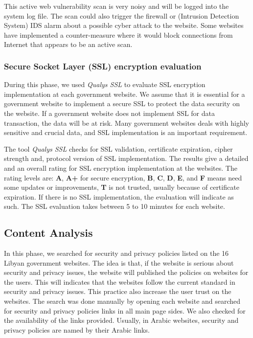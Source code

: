 \documentclass[conference]{IEEEtran}
\begin{document}
This active web vulnerability scan is very noisy and will be logged
into the system log file. The scan could also trigger the firewall or
(Intrusion Detection System) IDS alarm about a possible cyber attack
to the website. Some websites have implemented a counter-measure where
it would block connections from Internet that appears to be an active
scan\cite{stuttard2011web}.

\subsubsection{Secure Socket Layer (SSL) encryption evaluation}


During this phase, we used \emph{Qualys SSL} to evaluate SSL
encryption implementation at each government website. We assume that
it is essential for a government website to implement a secure SSL to
protect the data security on the website. If a government website does
not implement SSL for data transaction, the data will be at risk. Many
government websites deals with highly sensitive and crucial data, and
SSL implementation is an important requirement.

The tool \emph{Qualys SSL} checks for SSL validation, certificate
expiration, cipher strength and, protocol version of SSL
implementation. The results give a detailed and an overall rating for
SSL encryption implementation at the websites. The rating levels are:
\textbf{A}, \textbf{A+} for secure encryption, \textbf{B}, \textbf{C},
\textbf{D}, \textbf{E}, and \textbf{F} means need some updates or
improvements, \textbf{T} is not trusted, usually because of
certificate expiration. If there is no SSL implementation, the
evaluation will indicate as such.  The SSL evaluation takes between 5
to 10 minutes for each website.

\subsection{Content Analysis}

In this phase, we searched for security and privacy policies listed on
the 16 Libyan government websites. The idea is that, if the website is
serious about security and privacy issues, the website will published
the policies on websites for the users. This will indicates that the
websites follow the current standard in security and privacy
issues. This practice also increase the user trust on the
websites. The search was done manually by opening each
website and searched for security and privacy policies links in all
main page sides. We also checked for the availability of the
links provided. Usually, in Arabic websites, security and privacy policies are
named by their Arabic links.
\end{document}
